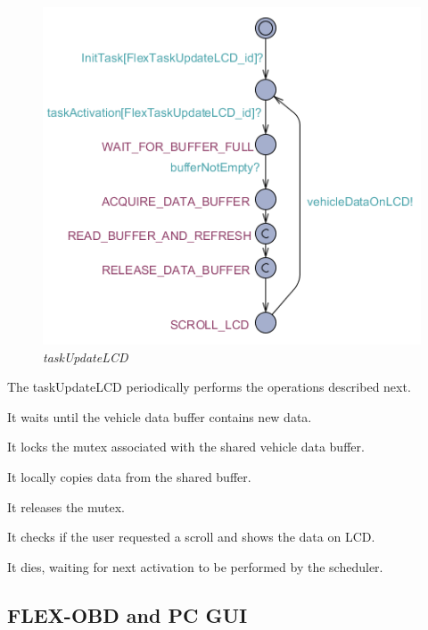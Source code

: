 \documentclass[paper=a4, fontsize=11pt]{scrartcl} %
\numberwithin{equation}{section} %
\numberwithin{figure}{section} %
\numberwithin{table}{section} %
\begin{document}
\begin{figure}[H]
  \centering
  \includegraphics[width=4.5in]{img/FLEX-OBD-LCD_taskUpdateLCD}
  \caption{\textit{taskUpdateLCD}}
\end{figure}

The taskUpdateLCD periodically performs the operations described next.

It waits until the vehicle data buffer contains new data.

It locks the mutex associated with the shared vehicle data buffer.

It locally copies data from the shared buffer.

It releases the mutex.

It checks if the user requested a scroll and shows the data on LCD.

It dies, waiting for next activation to be performed by the scheduler.


\subsection{FLEX-OBD and PC GUI}
\end{document}
